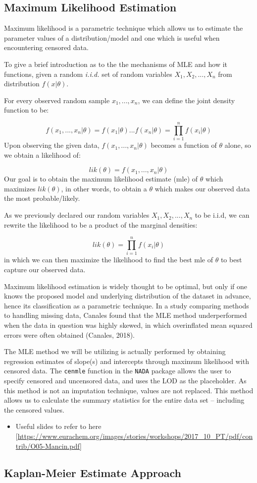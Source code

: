 \documentclass[12pt, twoside]{amherstthesis}
\providecommand{\tightlist}{%
  \setlength{\itemsep}{0pt}\setlength{\parskip}{0pt}}
\begin{document}
\hypertarget{MLE}{%
\subsection{Maximum Likelihood Estimation}\label{MLE}}

Maximum likelihood is a parametric technique which allows us to estimate the parameter values of a distribution/model and one which is useful when encountering censored data.

To give a brief introduction as to the the mechanisms of MLE and how it functions, given a random \emph{i.i.d.} set of random variables \(X_1, X_2,...,X_n\) from distribution \(f(x|\theta)\).

For every observed random sample \(x_1,...,x_n\), we can define the joint density function to be:

\[f(x_1,...,x_n|\theta) = f(x_1|\theta)...f(x_n|\theta) = \prod_{i=1}^{n}f(x_i|\theta)\]
Upon observing the given data, \(f(x_1,...,x_n|\theta)\) becomes a function of \(\theta\) alone, so we obtain a likelihood of:

\[lik(\theta) = f(x_1,...,x_n|\theta)\]
Our goal is to obtain the maximum likelihood estimate (mle) of \(\theta\) which maximizes \(lik(\theta)\), in other words, to obtain a \(\theta\) which makes our observed data the most probable/likely.

As we previously declared our random variables \(X_1, X_2,...,X_n\) to be i.i.d, we can rewrite the likelihood to be a product of the marginal densities:

\[lik(\theta) = \prod_{i=1}^{n} f(x_i|\theta)\]
in which we can then maximize the likelihood to find the best mle of \(\theta\) to best capture our observed data.

Maximum likelihood estimation is widely thought to be optimal, but only if one knows the proposed model and underlying distribution of the dataset in advance, hence its classification as a parametric technique. In a study comparing methods to handling missing data, Canales found that the MLE method underperformed when the data in question was highly skewed, in which overinflated mean squared errors were often obtained (Canales, 2018).

The MLE method we will be utilizing is actually performed by obtaining regression estimates of slope(s) and intercepts through maximum likelihood with censored data. The \texttt{cenmle} function in the \texttt{NADA} package allows the user to specify censored and uncensored data, and uses the LOD as the placeholder. As this method is not an imputation technique, values are not replaced. This method allows us to calculate the summary statistics for the entire data set -- including the censored values.
\begin{itemize}
\tightlist
\item
  Useful slides to refer to here {[}\url{https://www.eurachem.org/images/stories/workshops/2017_10_PT/pdf/contrib/O05-Mancin.pdf}{]}
\end{itemize}
\hypertarget{Kaplan-Meier}{%
\subsection{Kaplan-Meier Estimate Approach}\label{Kaplan-Meier}}
\end{document}

